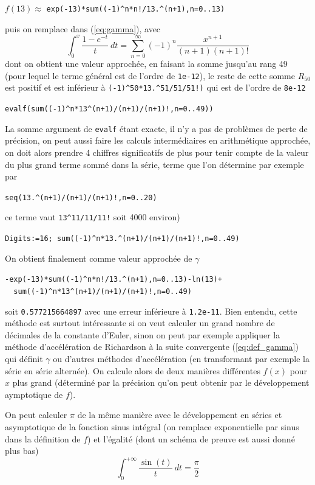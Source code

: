 \documentclass[a4paper,11pt]{article}
\begin{document}
\begin{center}
$f(13) \approx$ \verb|exp(-13)*sum((-1)^n*n!/13.^(n+1),n=0..13)|
\end{center}
puis on remplace dans (\ref{eq:gamma}), avec 
\[ \int_0^{x} \frac{1-e^{-t}}{t} \ dt = 
\sum_{n=0}^{\infty} (-1)^n \frac{x^{n+1}}{(n+1) (n+1)!}\]
dont on obtient une valeur approch\'ee, 
en faisant la somme jusqu'au rang 49 (pour lequel
le terme g\'en\'eral est de l'ordre de \verb|1e-12|),
le reste de cette somme $R_{50}$ est positif et est inf\'erieur \`a
{\tt (-1)\verb|^|50*13.\verb|^|51/51/51!)} qui est de l'ordre de 
\verb|8e-12|
\begin{center}
\verb|evalf(sum((-1)^n*13^(n+1)/(n+1)/(n+1)!,n=0..49))|
\end{center}
La somme argument de \verb|evalf|
\'etant exacte, il n'y a pas de probl\`emes de perte de pr\'ecision,
on peut aussi faire les calculs interm\'ediaires en arithm\'etique approch\'ee,
on doit alors prendre 4 chiffres significatifs de plus
pour tenir compte de la valeur du plus grand terme
somm\'e dans la s\'erie, terme que l'on d\'etermine par exemple par
\begin{center}
{\tt seq(13.\verb|^|(n+1)/(n+1)/(n+1)!,n=0..20)}
\end{center} 
ce terme vaut \verb|13^11/11/11!| soit 4000 environ)
\begin{center}
\verb|Digits:=16; sum((-1)^n*13.^(n+1)/(n+1)/(n+1)!,n=0..49)|
\end{center}
On obtient finalement comme valeur approch\'ee de $\gamma$
\begin{center}
\verb|-exp(-13)*sum((-1)^n*n!/13.^(n+1),n=0..13)-ln(13)+|\\
\verb|  sum((-1)^n*13^(n+1)/(n+1)/(n+1)!,n=0..49)|
\end{center}
soit \verb|0.577215664897| avec une erreur inf\'erieure \`a \verb|1.2e-11|.
Bien entendu, cette m\'ethode est surtout int\'eressante si on veut calculer
un grand nombre de d\'ecimales de la constante d'Euler, sinon
on peut par exemple appliquer la m\'ethode d'acc\'el\'eration de Richardson \`a
la suite convergente (\ref{eq:def_gamma}) qui d\'efinit $\gamma$
ou d'autres m\'ethodes d'acc\'el\'eration (en transformant par
exemple la s\'erie en s\'erie altern\'ee). On calcule alors
de deux mani\`eres diff\'erentes $f(x)$ pour $x$ plus grand (d\'etermin\'e
par la pr\'ecision qu'on peut obtenir par le d\'eveloppement
aymptotique de $f$).

On peut calculer $\pi$ de la même manière avec le développement 
en séries et asymptotique
de la fonction sinus intégral (on remplace exponentielle par sinus dans
la définition de $f$) et l'égalité (dont un sch\'ema de preuve est aussi
donn\'e plus bas)
\begin{equation} \label{eq:Siinf}
 \int_0^{+\infty} \frac{\sin(t)}{t} \ dt = \frac{\pi}{2}
\end{equation}
\end{document}
